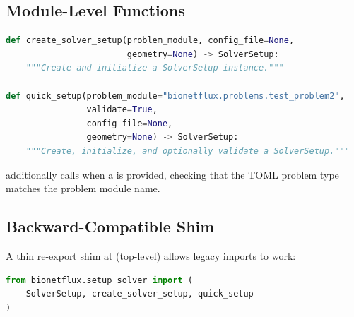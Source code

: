 \subsection{Module-Level Functions}

\begin{lstlisting}[language=Python, caption={Convenience factories}]
def create_solver_setup(problem_module, config_file=None,
                        geometry=None) -> SolverSetup:
    """Create and initialize a SolverSetup instance."""

def quick_setup(problem_module="bionetflux.problems.test_problem2",
                validate=True,
                config_file=None,
                geometry=None) -> SolverSetup:
    """Create, initialize, and optionally validate a SolverSetup."""
\end{lstlisting}

 additionally calls 
when a  is provided, checking that the TOML problem type
matches the problem module name.

\subsection{Backward-Compatible Shim}

A thin re-export shim at  (top-level) allows legacy
 imports to work:

\begin{lstlisting}[language=Python, caption={src/setup\_solver.py}]
from bionetflux.setup_solver import (
    SolverSetup, create_solver_setup, quick_setup
)
\end{lstlisting}
